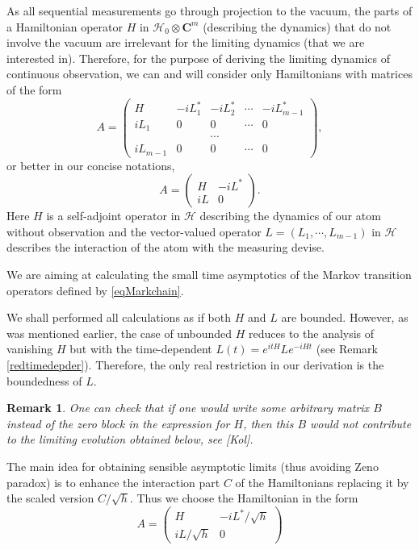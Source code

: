 \documentclass[10pt,a4paper]{amsart}
\def\HC{\mathcal{H}}
\def\C{\mathbf{C}}
\newtheorem{remark}{Remark}
\begin{document}
As all sequential measurements go through projection to the vacuum, the parts of a Hamiltonian operator $H$
in $\HC_0\otimes \C^m$ (describing the dynamics) that do not involve the vacuum are irrelevant for the limiting
dynamics (that we are interested in). Therefore, for the purpose of deriving the limiting dynamics
of continuous observation, we can and will consider only  Hamiltonians
with matrices of the form
\[
A= \begin{pmatrix}
H & -iL_1^* & -iL_2^* &\cdots & -iL_{m-1}^*  \\
iL_1 & 0 & 0 & \cdots & 0 \\
&  &  \cdots &  & \\
iL_{m-1} & 0 & 0 & \cdots & 0
\end{pmatrix},
\]
or better in our concise notations,
\[
A= \begin{pmatrix}
H & -iL^*   \\
iL & 0
\end{pmatrix}.
\]
Here $H$ is a self-adjoint operator in $\HC$ describing
the dynamics of our atom without observation and the vector-valued operator $L=(L_1, \cdots , L_{m-1})$
in $\HC$ describes the interaction of the atom with the measuring devise.

We are aiming at calculating the small time asymptotics of the
Markov transition operators defined by \eqref{eqMarkchain}.

We shall performed all calculations as if both $H$ and $L$ are bounded. However, as was mentioned earlier,
the case of unbounded $H$ reduces to the analysis of vanishing $H$ but with the time-dependent
$L(t)=e^{itH}Le^{-iHt}$ (see Remark \ref{redtimedepder}). Therefore, the only real restriction
in our derivation is the boundedness of $L$.

\begin{remark}
One can check that if one would write some arbitrary matrix $B$ instead
of the zero block in the expression for $H$, then
this $B$ would not contribute to the limiting evolution obtained below, see [Kol].
\end{remark}

The main idea for obtaining sensible asymptotic limits (thus avoiding Zeno paradox)
is to enhance the interaction part $C$ of the Hamiltonians
 replacing it by the scaled version $C/\sqrt h$. Thus we choose the Hamiltonian in the form
\begin{equation}
\label{interham}
A= \begin{pmatrix}
H & -iL^*/\sqrt h   \\
iL/\sqrt h & 0
\end{pmatrix}
\end{equation}
\end{document}
